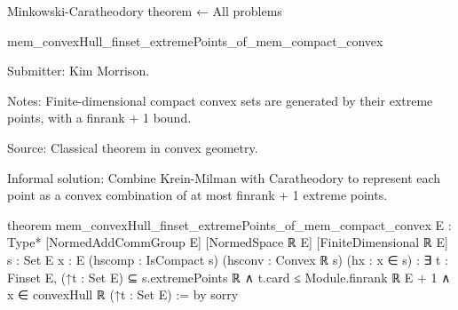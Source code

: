 Minkowski-Caratheodory theorem
← All problems

mem_convexHull_finset_extremePoints_of_mem_compact_convex

Submitter: Kim Morrison.

Notes: Finite-dimensional compact convex sets are generated by their extreme points, with a finrank + 1 bound.

Source: Classical theorem in convex geometry.

Informal solution: Combine Krein-Milman with Caratheodory to represent each point as a convex combination of at most finrank + 1 extreme points.

theorem mem_convexHull_finset_extremePoints_of_mem_compact_convex {E : Type*} [NormedAddCommGroup E] [NormedSpace ℝ E] [FiniteDimensional ℝ E]
    {s : Set E} {x : E}
    (hscomp : IsCompact s)
    (hsconv : Convex ℝ s)
    (hx : x ∈ s) :
    ∃ t : Finset E,
      (↑t : Set E) ⊆ s.extremePoints ℝ ∧
      t.card ≤ Module.finrank ℝ E + 1 ∧
      x ∈ convexHull ℝ (↑t : Set E) := by
  sorry